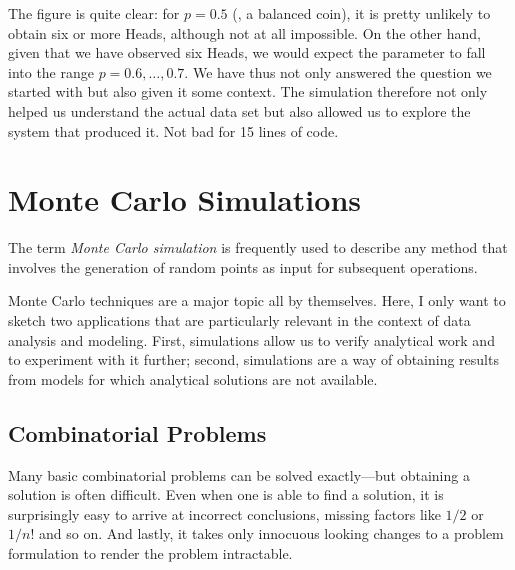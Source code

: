 The figure is quite clear: for $p=0.5$ (\ie, a balanced coin), it is
pretty unlikely to obtain six or more Heads, although not at all
impossible. On the other hand, given that we have observed six Heads,
we would expect the parameter to fall into the range $p=0.6, \dots,
0.7$.  We have thus not only answered the question we started with but
also given it some context. The simulation therefore not only helped
us understand the actual data set but also allowed us to explore the
system that produced it. Not bad for 15 lines of code.


\section{Monte Carlo Simulations}

  
The term \emph{Monte Carlo simulation} is frequently used to describe
any method that involves the generation of random points as input for
subsequent operations.

Monte Carlo techniques are a major topic all by themselves. Here, I
only want to sketch two applications that are particularly relevant in
the context of data analysis and modeling. First, simulations allow us
to verify analytical work and to experiment with it further; second,
simulations are a way of obtaining results from models for which
analytical solutions are not available.

% 


\subsection{Combinatorial Problems}


Many basic combinatorial problems can be solved exactly---but
obtaining a solution is often difficult.  Even when one is able to
find a solution, it is surprisingly easy to arrive at incorrect
conclusions, missing factors like $1/2$ or $1/n!$ and so on.  And
lastly, it takes only innocuous looking changes to a problem
formulation to render the problem intractable.

